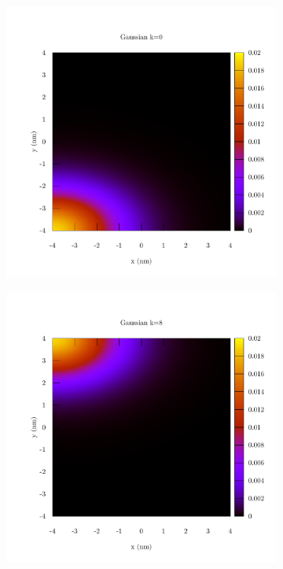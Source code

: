 \documentclass[12pt,a4]{article}
\begin{document}
\begin{figure}[H]
	\begin{subfigure}{0.33\textwidth}
		\includegraphics[width=\textwidth]{../plots/basis_0.pdf}
	\end{subfigure}
	\begin{subfigure}{0.33\textwidth}
		\includegraphics[width=\textwidth]{../plots/basis_8.pdf}

\end{subfigure}
\end{figure}
\end{document}

